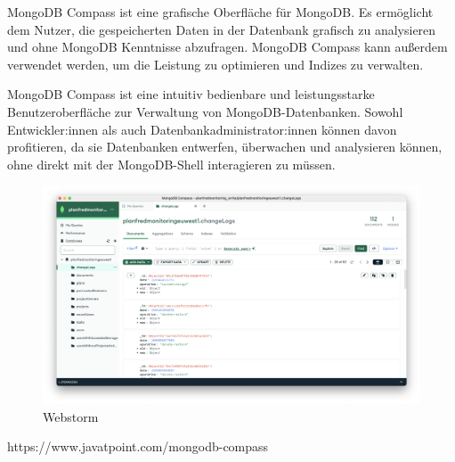 MongoDB Compass ist eine grafische Oberfläche für MongoDB. Es ermöglicht dem Nutzer, die gespeicherten Daten in der Datenbank grafisch zu analysieren und ohne MongoDB Kenntnisse abzufragen. MongoDB Compass kann außerdem verwendet werden, um die Leistung zu optimieren und Indizes zu verwalten.\newline

MongoDB Compass ist eine intuitiv bedienbare und leistungsstarke Benutzeroberfläche zur Verwaltung von MongoDB-Datenbanken. Sowohl Entwickler:innen als auch Datenbankadministrator:innen können davon profitieren, da sie Datenbanken entwerfen, überwachen und analysieren können, ohne direkt mit der MongoDB-Shell interagieren zu müssen.

\begin{figure}[h!]
    \centering
    \includegraphics[width=1\linewidth]{pics/mongodb-compass.png}
    \caption{Webstorm}
    \label{fig:enter-label}
\end{figure}
https://www.javatpoint.com/mongodb-compass
